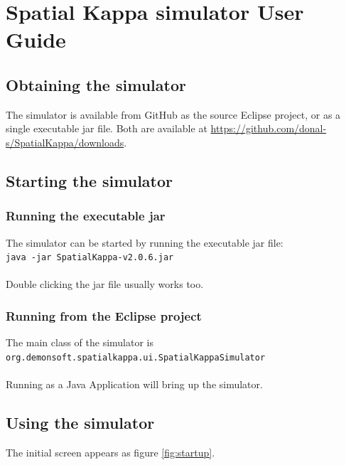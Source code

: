 \chapter{Spatial Kappa simulator User Guide}

\section{Obtaining the simulator}

The simulator is available from GitHub as the source Eclipse project, or as a single executable jar file. Both are available at \url{https://github.com/donal-s/SpatialKappa/downloads}. 

\section{Starting the simulator}

\subsection{Running the executable jar}

The simulator can be started by running the executable jar file:\\
\verb|java -jar SpatialKappa-v2.0.6.jar|\\\\
Double clicking the jar file usually works too.

\subsection{Running from the Eclipse project}

The main class of the simulator is \\
\verb|org.demonsoft.spatialkappa.ui.SpatialKappaSimulator|\\\\
Running as a Java Application will bring up the simulator.


\section{Using the simulator}

The initial screen appears as figure \ref{fig:startup}.

